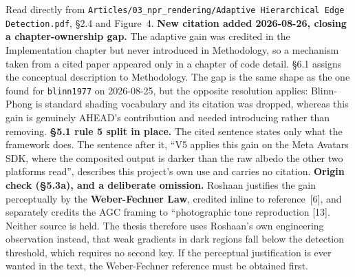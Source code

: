 \documentclass[11pt, a4paper]{article}
\begin{document}
\begin{Form}
  {Read directly from \texttt{\footnotesize Articles/03\_npr\_rendering/Adaptive Hierarchical Edge Detection.pdf}, \S2.4 and Figure~4. \textbf{New citation added 2026-08-26, closing a chapter-ownership gap.} The adaptive gain was credited in the Implementation chapter but never introduced in Methodology, so a mechanism taken from a cited paper appeared only in a chapter of code detail. \S6.1 assigns the conceptual description to Methodology. The gap is the same shape as the one found for \texttt{blinn1977} on 2026-08-25, but the opposite resolution applies: Blinn-Phong is standard shading vocabulary and its citation was dropped, whereas this gain is genuinely AHEAD's contribution and needed introducing rather than removing. \textbf{\S5.1 rule 5 split in place.} The cited sentence states only what the framework does. The sentence after it, ``V5 applies this gain on the Meta Avatars SDK, where the composited output is darker than the raw albedo the other two platforms read'', describes this project's own use and carries no citation. \textbf{Origin check (\S5.3a), and a deliberate omission.} Roshaan justifies the gain perceptually by the \textbf{Weber-Fechner Law}, credited inline to reference~[6], and separately credits the AGC framing to ``photographic tone reproduction [13]. Neither source is held. The thesis therefore uses Roshaan's own engineering observation instead, that weak gradients in dark regions fall below the detection threshold, which requires no second key. If the perceptual justification is ever wanted in the text, the Weber-Fechner reference must be obtained first.}


\end{Form}
\end{document}
